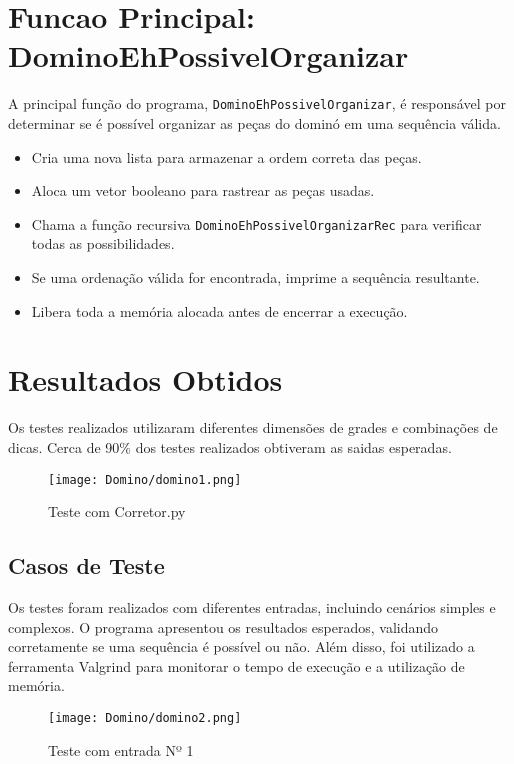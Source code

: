 \documentclass[a4paper,12pt]{article}
\begin{document}
\section{Funcao Principal: DominoEhPossivelOrganizar}
A principal função do programa, \texttt{DominoEhPossivelOrganizar}, é responsável por determinar se é possível organizar as peças do dominó em uma sequência válida.

\begin{itemize}
    \item Cria uma nova lista para armazenar a ordem correta das peças.
    \item Aloca um vetor booleano para rastrear as peças usadas.
    \item Chama a função recursiva \texttt{DominoEhPossivelOrganizarRec} para verificar todas as possibilidades.
    \item Se uma ordenação válida for encontrada, imprime a sequência resultante.
    \item Libera toda a memória alocada antes de encerrar a execução.
\end{itemize}


\section{Resultados Obtidos}
Os testes realizados utilizaram diferentes dimens\~oes de grades e combina\c{c}\~oes de dicas. Cerca de 90\% dos testes realizados obtiveram as saidas esperadas. 

\begin{figure}[H]
    \centering
    \texttt{[image: Domino/domino1.png]}
    \caption{Teste com Corretor.py}
\end{figure}

\subsection{Casos de Teste}
Os testes foram realizados com diferentes entradas, incluindo cen\'arios simples e complexos. O programa apresentou os resultados esperados, validando corretamente se uma sequ\^encia \'e poss\'ivel ou n\~ao. Além disso, foi utilizado a ferramenta Valgrind
para monitorar o tempo de execução e a utilização de memória.

\begin{figure}[H]
    \centering
    \texttt{[image: Domino/domino2.png]}
    \caption{Teste com entrada Nº 1}
\end{figure}
\end{document}
